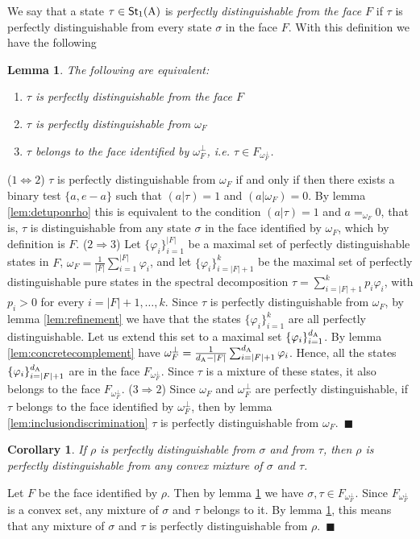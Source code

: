 \documentclass[12pt,aps,pra,showpacs,groupedaddress]{revtex4-1}
\newtheorem{lemma}{Lemma} \newtheorem{proposition}{Proposition}
\newtheorem{corollary}{Corollary} \newtheorem{theorem}{Theorem}
\def\Proof{\medskip\par\noindent{\bf Proof. }}
\def\qed{$\,\blacksquare$\par}
\def\Stset{{\mathsf{St}}}
\def\SC#1#2{\left(#1\right|\left.\!#2\right)}  \def\Tr{{\rm Tr}}
\begin{document}
  
We say that a state $\tau\in\Stset_1 (\rA)$ is \emph{perfectly distinguishable from the face $F$} if
$\tau$ is perfectly distinguishable from every state $\sigma$ in the face $F$.  With this definition
we have the following
\begin{lemma}\label{lem:trecondizioni}
The following are equivalent: 
\begin{enumerate}
\item $\tau$ is perfectly distinguishable from the face $F$
\item $\tau$  is perfectly distinguishable from $\omega_F$
\item $\tau$ belongs to the face identified by $\omega_F^\perp$, i.e. $\tau \in F_{\omega_F^\perp}$. 
\end{enumerate}
\end{lemma}
\Proof ($1 \Leftrightarrow 2$) $\tau$ is perfectly distinguishable from $\omega_F$ if and only if
then there exists a binary test $\{a,e-a\}$ such that $\SC a \tau =1$ and $\SC a {\omega_F}=0$.  By
lemma \ref{lem:detuponrho} this is equivalent to the condition $\SC a \tau =1$ and $a=_{\omega_F}
0$, that is, $\tau$ is distinguishable from any state $\sigma$ in the face identified by $\omega_F$,
which by definition is $F$. ($2 \Rightarrow 3$)  Let $\{\varphi_i\}_{i=1}^{|F|}$ be a maximal set of
perfectly distinguishable states in $F$, $\omega_F  =  \frac 1 {|F|}  \sum_{i =1}^{|F|} \varphi_i$, and let $\{\varphi_i\}_{i=|F| +1}^k$ be the maximal set of
perfectly distinguishable pure states in the spectral decomposition $\tau = \sum_{i=|F| +1}^k p_i  \varphi_i$,  with $p_i>0$ for every $i = |F| +1, \dots, k$. Since $\tau $ is perfectly
distinguishable from $\omega_F$, by lemma \ref{lem:refinement} we have that the states
$\{\varphi_i\}_{i=1}^{k}$ are all perfectly distinguishable. Let us extend this set to a maximal set
$\{\varphi_i\}_{i=1}^{d_{\rm A}}$.  By lemma \ref{lem:concretecomplement} have $\omega_F^\perp = \frac 1
{d_{\rm A} -|F|}   \sum_{i=|F|+1}^{d_{\rm A}} \varphi_i$. Hence, all the states $\{\varphi_i\}_{i =  |F| +1}^{d_{\rm A}}$ are in the face $F_{\omega_F^\perp}$. Since $\tau$ is a mixture of these states, it also belongs to the face  $F_{\omega_F^\perp}$.  
  ($3 \Rightarrow 2$) Since $\omega_F$ and $\omega_F^\perp$ are
perfectly distinguishable, if $\tau$ belongs to the face identified by $\omega_F^\perp$, then by
lemma \ref{lem:inclusiondiscrimination} $\tau$ is perfectly distinguishable from $\omega_F$.
\qed


\begin{corollary}\label{cor:distinguishablityfromconvexcomb}
  If $\rho$ is perfectly distinguishable from $\sigma$ and from $\tau$, then $\rho$ is perfectly
  distinguishable from any convex mixture of $\sigma$ and $\tau$.
\end{corollary}
\Proof Let $F$ be the face identified by $\rho$. Then by lemma \ref{lem:trecondizioni} we have
$\sigma, \tau\in F_{\omega_F^\perp}$. Since $F_{\omega_F^\perp}$ is a convex set, any mixture of
$\sigma$ and $\tau$ belongs to it.  By lemma \ref{lem:trecondizioni}, this means that any mixture of
$\sigma$ and $\tau$ is perfectly distinguishable from $\rho$. \qed
 
\end{document}
